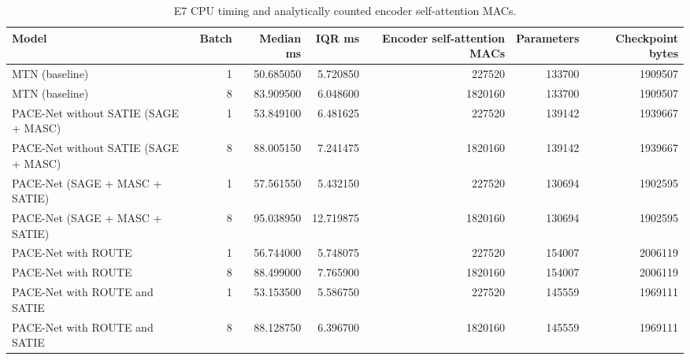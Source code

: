 \begin{table}[t]
\centering
\small
\begin{tabular}{lrrrrrr}
\hline
Model & Batch & Median ms & IQR ms & Encoder self-attention MACs & Parameters & Checkpoint bytes \\
\hline
MTN (baseline) & 1 & 50.685050 & 5.720850 & 227520 & 133700 & 1909507 \\
MTN (baseline) & 8 & 83.909500 & 6.048600 & 1820160 & 133700 & 1909507 \\
PACE-Net without SATIE (SAGE + MASC) & 1 & 53.849100 & 6.481625 & 227520 & 139142 & 1939667 \\
PACE-Net without SATIE (SAGE + MASC) & 8 & 88.005150 & 7.241475 & 1820160 & 139142 & 1939667 \\
PACE-Net (SAGE + MASC + SATIE) & 1 & 57.561550 & 5.432150 & 227520 & 130694 & 1902595 \\
PACE-Net (SAGE + MASC + SATIE) & 8 & 95.038950 & 12.719875 & 1820160 & 130694 & 1902595 \\
PACE-Net with ROUTE & 1 & 56.744000 & 5.748075 & 227520 & 154007 & 2006119 \\
PACE-Net with ROUTE & 8 & 88.499000 & 7.765900 & 1820160 & 154007 & 2006119 \\
PACE-Net with ROUTE and SATIE & 1 & 53.153500 & 5.586750 & 227520 & 145559 & 1969111 \\
PACE-Net with ROUTE and SATIE & 8 & 88.128750 & 6.396700 & 1820160 & 145559 & 1969111 \\
\hline
\end{tabular}
\caption{E7 CPU timing and analytically counted encoder self-attention MACs.}
\end{table}

